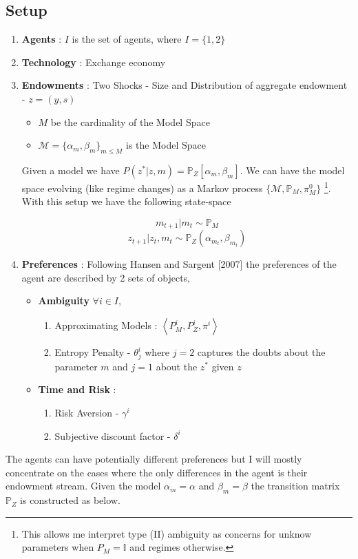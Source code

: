 \documentclass[12pt]{article}
\begin{document}
\subsection{Setup}
\begin{enumerate}
		\item \textbf{Agents}  : $I$ is the  set of agents, where $I= \{1,2\}$
		\item \textbf{Technology} : Exchange economy
		\item \textbf{Endowments}  : Two Shocks - Size and
                  Distribution of aggregate endowment - $z=(y,s)$

									\begin{itemize}
											\item $M$ be the cardinality of the Model Space
											\item $\mathcal{M}=\{\alpha_m,\beta_m\}_{m\leq M}$ is the Model Space
									\end{itemize}
									
\noindent Given a model we have $P(z^*|z,m)=\mathbb{P}_{Z}[\alpha_m,\beta_m]$. We can have the model space evolving (like regime changes) as a Markov process $\{\mathcal{M},\mathbb{P}_{M},\pi^0_{M}\}$ \footnote{This allows me interpret type (II) ambiguity as concerns for unknow parameters when $P_M=\mathbb{I}$ and regimes otherwise.}. With this setup we have the following state-space

\[m_{t+1} | m_t \sim \mathbb{P}_{M}\]
\[z_{t+1}|z_t,m_t \sim \mathbb{P}_{Z}(\alpha_{m_t},\beta_{m_t})\]

\item \textbf{Preferences} : Following Hansen and Sargent [2007] the preferences of the agent are described by 2 sets of 		objects, 
								\begin{itemize}
										\item \textbf{Ambiguity}
													$\forall i \in I,$
												\begin{enumerate}
															\item Approximating Models :   $\left\langle  P^i_M,P_Z^i, \pi^i \right\rangle$
															\item Entropy Penalty - $\theta_j^i$ where $j=2$ captures the doubts about the parameter $m$ and $j=1$ about the $z^*$ given $z$
												\end{enumerate}
											\item \textbf{Time and Risk} :
																\begin{enumerate}
																		\item Risk Aversion - $\gamma^i$
																		\item Subjective discount factor - $\delta^i$
																\end{enumerate}
 												\end{itemize}
\end{enumerate}
The agents can have potentially different preferences but I will mostly concentrate on the cases where the only differences in the agent is their endowment stream. Given the model $\alpha_m=\alpha$ and $\beta_m= \beta$ the transition matrix $\mathbb{P}_{Z}$ is constructed as below. 
\end{document}
